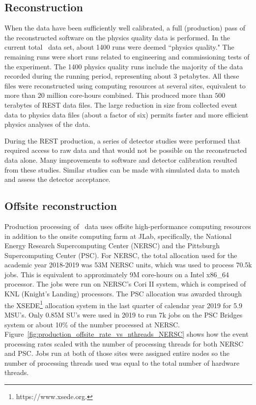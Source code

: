 \subsection{Reconstruction \label{sec:recreconstruction}}

When the data have been sufficiently well calibrated, a full (production) pass of the reconstructed software on the physics quality data is performed. In the current total \GX~data set, about 1400 runs were deemed ``physics quality." The remaining runs were short runs related to engineering and commissioning tests of the experiment. The 1400 physics quality runs include the majority of the data recorded during the running period, representing about 3 petabytes. All these files were reconstructed using computing resources at several sites, equivalent to more than 20 million core-hours combined. This produced more than $500$ terabytes of REST data files. The large reduction in size from collected event data to physics data files (about a factor of six) permits faster and more efficient physics analyses of the data.

During the REST production, a series of detector studies were performed that required access to raw data and that would not be possible on the reconstructed data alone. Many improvements to software and detector calibration resulted from these studies. Similar studies can be made with simulated data to match and assess the detector acceptance.

\subsection{Offsite reconstruction}
\label{sec:recoffsite}

Production processing of \GX~data uses offsite high-performance computing resources in addition to the onsite computing farm at JLab, specifically, the National Energy Research Supercomputing Center (NERSC) and the Pittsburgh Supercomputing Center (PSC). For NERSC, the total allocation used for the academic year 2018-2019 was 53M NERSC units, which was used to process 70.5k jobs. This is equivalent to approximately 9M core-hours on a Intel x86\_64 processor. The jobs were run on NERSC's Cori II system, which is comprised of KNL (Knight's Landing) processors. The PSC allocation was awarded through the XSEDE\footnote{https://www.xsede.org.} allocation system in the last quarter of calendar year 2019 for 5.9 MSU's. Only 0.85M SU's were used in 2019 to run 7k jobs on the PSC Bridges system or about 10\% of the number processed at NERSC. Figure~\ref{fig:production_offsite_rate_vs_nthreads_NERSC} shows how the event processing rates scaled with the number of processing threads for both NERSC and PSC. Jobs run at both of those sites were assigned entire nodes so the number of processing threads used was equal to the total number of hardware threads.

